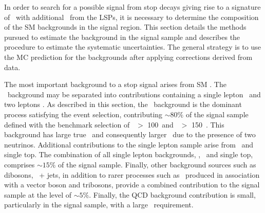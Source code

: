 
In order to search for a possible signal from stop decays giving rise to a signature of \ttbar\ with additional \met\
from the LSPs, it is necessary to determine the composition of the SM backgrounds in the signal region. 
This section details the methods pursued to estimate the background in the signal sample and describes the 
procedure to estimate the systematic uncertainties. The general strategy is to use the MC prediction for the 
backgrounds after applying corrections derived from data. 

The most important background to a stop signal arises from SM \ttbar. The \ttbar\ background may be 
separated into contributions containing a single lepton \ttlj\ and two leptons \ttll. As described in this section, 
the \ttll\ background is the dominant process satisfying the event selection, contributing $\sim 80\%$ of the 
signal sample defined with the benchmark selection of \met\ $>$ 100~\GeV and \mt\ $>$ 150~\GeV. This 
background has large true \met\ and consequently larger \mt\ due to the presence of two neutrinos.
Additional contributions to the single lepton sample arise from \wjets\ and single top. The combination of 
all single lepton backgrounds, \ttlj, \wjets\ and single top, comprises $\sim 15\%$ of the signal sample. 
Finally, other background sources such as dibosons, \dy\ + jets, in addition to rarer processes such as \ttbar\ 
produced in association with a vector boson and tribosons, provide a combined contribution to the signal sample 
at the level of $\sim 5\%$.
Finally, the QCD background contribution is small, particularly in the signal sample, with a large \met\ requirement.


